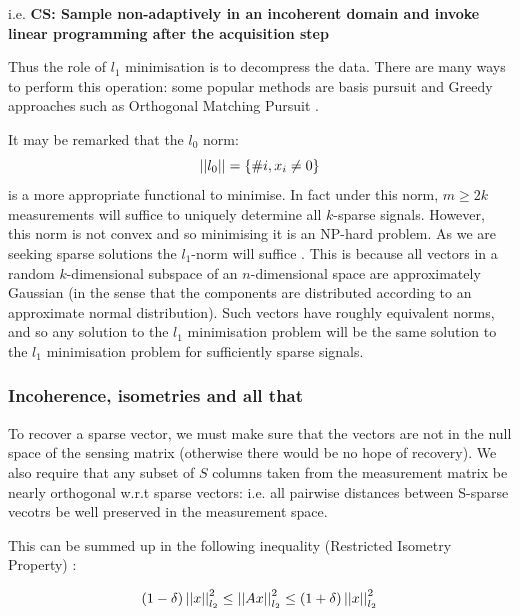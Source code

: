 i.e. \textbf{CS: Sample non-adaptively in an incoherent domain and invoke linear programming after the acquisition step}

Thus the role of \(l_{1}\) minimisation is to decompress the data. There are many ways to perform this operation: some popular methods are basis pursuit \cite{Chen1998} and Greedy approaches such as Orthogonal Matching Pursuit \cite{Tropp2007}. 

It may be remarked that the \(l_0\) norm:
%
\begin{equation}
\left|\left|l_0\right|\right| = \{\# i, x_i \neq 0\}
\end{equation}
%
is a more appropriate functional to minimise. In fact under this norm, \(m \geq 2k\) measurements will suffice to uniquely determine all \(k\)-sparse signals. However, this norm is not convex and so minimising it is an NP-hard problem. As we are seeking sparse solutions the \(l_1\)-norm will suffice \cite{Donoho2006a}. This is because all vectors in a random \(k\)-dimensional subspace of an \(n\)-dimensional space are approximately Gaussian (in the sense that the components are distributed according to an approximate normal distribution). Such vectors have roughly equivalent norms, and so any solution to the \(l_1\) minimisation problem will be the same solution to the \(l_1\) minimisation problem for sufficiently sparse signals.

\subsubsection{Incoherence, isometries and all that}
To recover a sparse vector, we must make sure that the vectors are not in the null space of the sensing matrix (otherwise there would be no hope of recovery). We also require that any subset of \(S\) columns taken from the measurement matrix be nearly orthogonal w.r.t sparse vectors: i.e. all pairwise distances between S-sparse vecotrs be well preserved in the measurement space.

This can be summed up in the following inequality (Restricted Isometry Property) \cite{Emma}:


\begin{definition}
\begin{equation}
\left(1-\delta\right)\left|\left|x\right|\right|_{l_2}^2 \leq \left|\left|Ax\right|\right|_{l_2}^2 \leq \left(1+\delta\right) \left|\left|x\right|\right|_{l_2}^2
\end{equation}
\label{RIP}
\end{definition}


